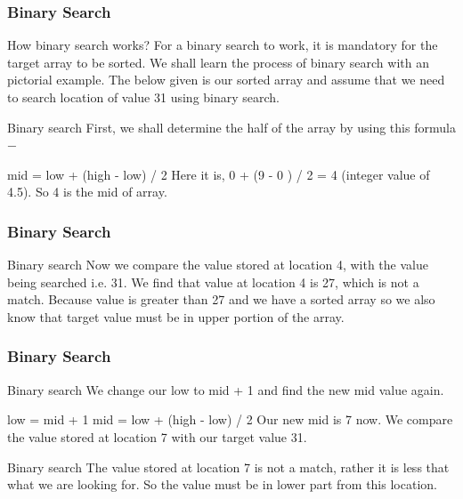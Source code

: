 \documentclass{beamer}
\begin{document}
\begin{frame}
\frametitle{Binary Search}
\large
How binary search works?
For a binary search to work, it is mandatory for the target array to be sorted. We shall learn the process of binary search with an pictorial example. The below given is our sorted array and assume that we need to search location of value 31 using binary search.

Binary search
First, we shall determine the half of the array by using this formula −

mid = low + (high - low) / 2
Here it is, 0 + (9 - 0 ) / 2 = 4 (integer value of 4.5). So 4 is the mid of array.
\end{frame}
\begin{frame}
\frametitle{Binary Search}
\large
Binary search
Now we compare the value stored at location 4, with the value being searched i.e. 31. We find that value at location 4 is 27, which is not a match. Because value is greater than 27 and we have a sorted array so we also know that target value must be in upper portion of the array.
\end{frame}
\begin{frame}
\frametitle{Binary Search}
\large
Binary search
We change our low to mid + 1 and find the new mid value again.

low = mid + 1
mid = low + (high - low) / 2
Our new mid is 7 now. We compare the value stored at location 7 with our target value 31.

Binary search
The value stored at location 7 is not a match, rather it is less that what we are looking for. So the value must be in lower part from this location.
\end{frame}
\end{document}
